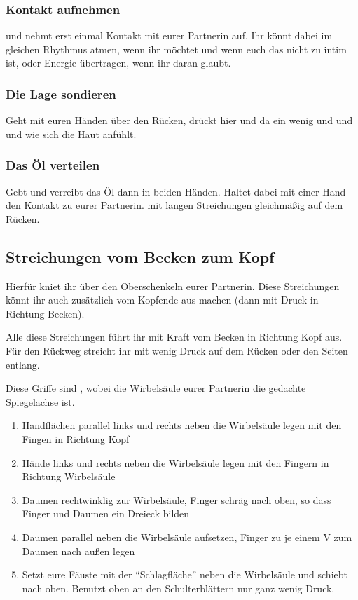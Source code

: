 \subsubsection{Kontakt aufnehmen}
 und nehmt erst einmal Kontakt mit eurer Partnerin auf. Ihr könnt dabei im gleichen Rhythmus atmen, wenn ihr möchtet und wenn euch das nicht zu intim ist, oder Energie übertragen, wenn ihr daran glaubt.

\subsubsection{Die Lage sondieren}
Geht mit euren Händen über den Rücken, drückt hier und da ein wenig und und  und wie sich die Haut anfühlt.

\subsubsection{Das Öl verteilen}

Gebt  und verreibt das Öl dann in beiden Händen. Haltet dabei mit einer Hand den Kontakt zu eurer Partnerin.  mit langen Streichungen gleichmäßig auf dem Rücken.


\subsection{Streichungen vom Becken zum Kopf}
Hierfür kniet ihr über den Oberschenkeln eurer Partnerin. Diese Streichungen könnt ihr auch zusätzlich vom Kopfende aus machen (dann mit Druck in Richtung Becken).

Alle diese Streichungen führt ihr mit Kraft vom Becken in Richtung Kopf aus. Für den Rückweg streicht ihr mit wenig Druck auf dem Rücken oder den Seiten entlang.

Diese Griffe sind , wobei die Wirbelsäule eurer Partnerin die gedachte Spiegelachse ist.

\begin{enumerate}
	\item {} Handflächen parallel links und rechts neben die Wirbelsäule legen mit den Fingen in Richtung Kopf
	\item {} Hände links und rechts neben die Wirbelsäule legen mit den Fingern in Richtung Wirbelsäule
	\item {} Daumen rechtwinklig zur Wirbelsäule, Finger schräg nach oben, so dass Finger und Daumen ein Dreieck bilden
	\item {} Daumen parallel neben die Wirbelsäule aufsetzen, Finger zu je einem V zum Daumen nach außen legen
	\item {} Setzt eure Fäuste mit der ``Schlagfläche'' neben die Wirbelsäule und schiebt nach oben. Benutzt oben an den Schulterblättern nur ganz wenig Druck.
\end{enumerate}


